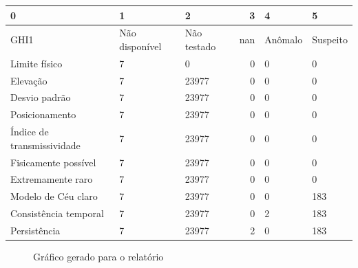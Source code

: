 \documentclass{article}
\begin{document}
\begin{tabular}{lllrll}
\hline
 0                          & 1              & 2           &   3 & 4       & 5        \\
\hline
 GHI1                       & Não disponível & Não testado & nan & Anômalo & Suspeito \\
 Limite físico              & 7              & 0           &   0 & 0       & 0        \\
 Elevação                   & 7              & 23977       &   0 & 0       & 0        \\
 Desvio padrão              & 7              & 23977       &   0 & 0       & 0        \\
 Posicionamento             & 7              & 23977       &   0 & 0       & 0        \\
 Índice de transmissividade & 7              & 23977       &   0 & 0       & 0        \\
 Fisicamente possível       & 7              & 23977       &   0 & 0       & 0        \\
 Extremamente raro          & 7              & 23977       &   0 & 0       & 0        \\
 Modelo de Céu claro        & 7              & 23977       &   0 & 0       & 183      \\
 Consistência temporal      & 7              & 23977       &   0 & 2       & 183      \\
 Persistência               & 7              & 23977       &   2 & 0       & 183      \\
\hline
\end{tabular}
\newpage

\begin{figure}[h!]
\centering
{}
\caption{Gráfico gerado para o relatório}
\end{figure}
\end{document}
